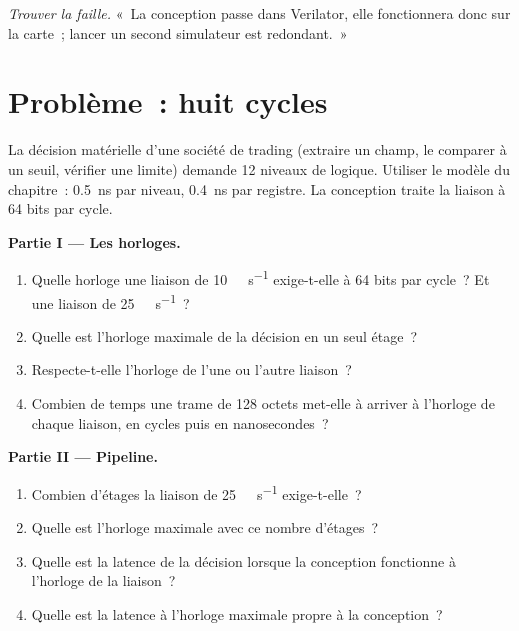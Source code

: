 \begin{exercise}[$\star\star\star$]\label{exo:nw:programmable-hardware-i-architecture-and-toolchain:8}
\emph{Trouver la faille.} «~La conception passe dans Verilator, elle fonctionnera donc sur la carte~; lancer un second simulateur est redondant.~»
\end{exercise}

\section{Problème~: huit cycles}

\begin{problem}\label{pb:nw:programmable-hardware-i-architecture-and-toolchain:1}
La décision matérielle d'une société de trading (extraire un champ, le comparer à un seuil, vérifier une limite) demande 12 niveaux de logique. Utiliser le modèle du chapitre~:
\qty{0.5}{\nano\second} par niveau, \qty{0.4}{\nano\second} par registre. La conception traite la liaison à 64 bits par cycle.

\medskip\noindent\textbf{Partie I --- Les horloges.}
\begin{enumerate}
\item Quelle horloge une liaison de \qty{10}{\giga\bit\per\second} exige-t-elle à 64 bits par cycle~? Et une liaison de \qty{25}{\giga\bit\per\second}~?
\item Quelle est l'horloge maximale de la décision en un seul étage~?
\item Respecte-t-elle l'horloge de l'une ou l'autre liaison~?
\item Combien de temps une trame de 128 octets met-elle à arriver à l'horloge de chaque liaison, en cycles puis en nanosecondes~?
\end{enumerate}

\medskip\noindent\textbf{Partie II --- Pipeline.}
\begin{enumerate}[resume]
\item Combien d'étages la liaison de \qty{25}{\giga\bit\per\second} exige-t-elle~?
\item Quelle est l'horloge maximale avec ce nombre d'étages~?
\item Quelle est la latence de la décision lorsque la conception fonctionne à l'horloge de la liaison~?
\item Quelle est la latence à l'horloge maximale propre à la conception~?
\end{enumerate}


\end{problem}
